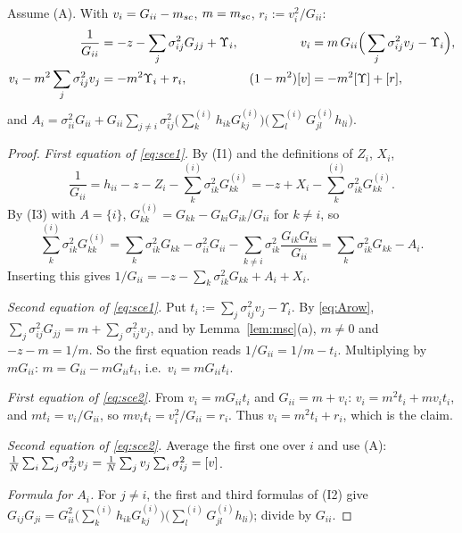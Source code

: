\begin{lemma}\label{lem:sce}
Assume \textup{(A)}. With $v_i=G_{ii}-m_{sc}$, $m=m_{sc}$, $r_i:=v_i^2/G_{ii}$:
\begin{align}
 \frac1{G_{ii}}&=-z-\sum_j\sigma_{ij}^2G_{jj}+\Upsilon_i, &
 v_i&=m\,G_{ii}\Big(\sum_j\sigma_{ij}^2v_j-\Upsilon_i\Big),\label{eq:sce1}\\
 v_i-m^2\sum_j\sigma^2_{ij}v_j&=-m^2\Upsilon_i+r_i, &
 (1-m^2)[v]&=-m^2[\Upsilon]+[r],\label{eq:sce2}
\end{align}
and $A_i=\sigma_{ii}^2G_{ii}+G_{ii}\sum_{j\ne i}\sigma_{ij}^2\big(\sum^{(i)}_kh_{ik}G^{(i)}_{kj}\big)\big(\sum^{(i)}_lG^{(i)}_{jl}h_{li}\big)$.
\end{lemma}
\begin{proof}
\emph{First equation of \eqref{eq:sce1}.} By (I1) and the definitions of $Z_i$, $X_i$,
\[
 \frac1{G_{ii}}=h_{ii}-z-Z_i-\sum^{(i)}_k\sigma_{ik}^2G^{(i)}_{kk}=-z+X_i-\sum^{(i)}_k\sigma_{ik}^2G^{(i)}_{kk}.
\]
By (I3) with $A=\{i\}$, $G^{(i)}_{kk}=G_{kk}-G_{ki}G_{ik}/G_{ii}$ for $k\ne i$, so
\[
 \sum^{(i)}_k\sigma_{ik}^2G^{(i)}_{kk}=\sum_{k}\sigma_{ik}^2G_{kk}-\sigma_{ii}^2G_{ii}-\sum_{k\ne i}\sigma_{ik}^2\frac{G_{ik}G_{ki}}{G_{ii}}=\sum_k\sigma_{ik}^2G_{kk}-A_i .
\]
Inserting this gives $1/G_{ii}=-z-\sum_k\sigma_{ik}^2G_{kk}+A_i+X_i$.

\emph{Second equation of \eqref{eq:sce1}.} Put $t_i:=\sum_j\sigma_{ij}^2v_j-\Upsilon_i$. By \eqref{eq:Arow}, $\sum_j\sigma_{ij}^2G_{jj}=m+\sum_j\sigma_{ij}^2v_j$, and by Lemma~\ref{lem:msc}(a), $m\ne0$ and $-z-m=1/m$. So the first equation reads
$1/G_{ii}=1/m-t_i$. Multiplying by $mG_{ii}$: $m=G_{ii}-mG_{ii}t_i$, i.e.\ $v_i=mG_{ii}t_i$.

\emph{First equation of \eqref{eq:sce2}.} From $v_i=mG_{ii}t_i$ and $G_{ii}=m+v_i$: $v_i=m^2t_i+mv_it_i$, and $mt_i=v_i/G_{ii}$, so $mv_it_i=v_i^2/G_{ii}=r_i$. Thus $v_i=m^2t_i+r_i$, which is the claim.

\emph{Second equation of \eqref{eq:sce2}.} Average the first one over $i$ and use (A): $\frac1N\sum_i\sum_j\sigma_{ij}^2v_j=\frac1N\sum_jv_j\sum_i\sigma_{ij}^2=[v]$.

\emph{Formula for $A_i$.} For $j\ne i$, the first and third formulas of (I2) give $G_{ij}G_{ji}=G_{ii}^2\big(\sum^{(i)}_kh_{ik}G^{(i)}_{kj}\big)\big(\sum^{(i)}_lG^{(i)}_{jl}h_{li}\big)$; divide by $G_{ii}$.
\end{proof}

